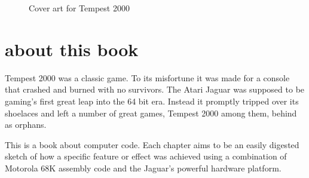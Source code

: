 \begin{figure}[H]
    \centering
    \begin{adjustbox}{width=12cm,center}
    \end{adjustbox}
\caption{Cover art for Tempest 2000}
\end{figure}
\clearpage
\chapter*{about this book} 
Tempest 2000 was a classic game. To its misfortune it was made for a console that crashed and burned with no
survivors. The Atari Jaguar was supposed to be gaming's first great leap into the 64 bit era. Instead it 
promptly tripped over its shoelaces and left a number of great games, Tempest 2000 among them, behind
as orphans.

This is a book about computer code. Each chapter aims to be an easily digested sketch of how
a specific feature or effect was achieved using a combination of Motorola 68K assembly code and
the Jaguar's powerful hardware platform.

